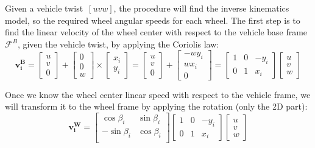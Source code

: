 Given a vehicle twist~$[u v w]$, the procedure will find the inverse kinematics model, so the required wheel angular speeds for each wheel. The first step is to find the linear velocity of the wheel center with respect to the vehicle base frame~$\mathcal{F}^B$, given the vehicle twist, by applying the Coriolis law: 
\begin{equation}
\mathbf{v^B_i} = 
\left[
 \begin{array}{c}
  u  \\
  v \\
  0
 \end{array}
\right]
+
\left[
 \begin{array}{c}
  0  \\
  0 \\
  w
 \end{array}
\right]
\times
\left[
 \begin{array}{c}
  x_i \\
  y_i
 \end{array}
\right] 
= 
\left[
 \begin{array}{c}
  u  \\
  v \\
  0
 \end{array}
\right]
+
\left[
\begin{array}{c}
 -w y_i \\
 w x_i \\
 0
\end{array}
\right] 
= 
\left[
\begin{array}{ccc}
 1 & 0 & -y_i \\
 0 & 1 &  x_i 
\end{array}
\right] 
\left[
\begin{array}{c}
 u \\
 v \\
 w
\end{array}
\right] 
\end{equation}

Once we know the wheel center linear speed with respect to the vehicle frame, we will transform it to the wheel frame by applying the rotation (only the 2D part): 
\begin{equation}
\mathbf{v^{W}_i} = 
\left[
 \begin{array}{cc}
  \cos \beta_i & \sin \beta_i  \\
  -\sin \beta_i & \cos \beta_i \\
 \end{array}
\right]
\left[
\begin{array}{ccc}
 1 & 0 & -y_i \\
 0 & 1 &  x_i 
\end{array}
\right] 
\left[
\begin{array}{c}
 u \\
 v \\
 w
\end{array}
\right] 
\end{equation}

